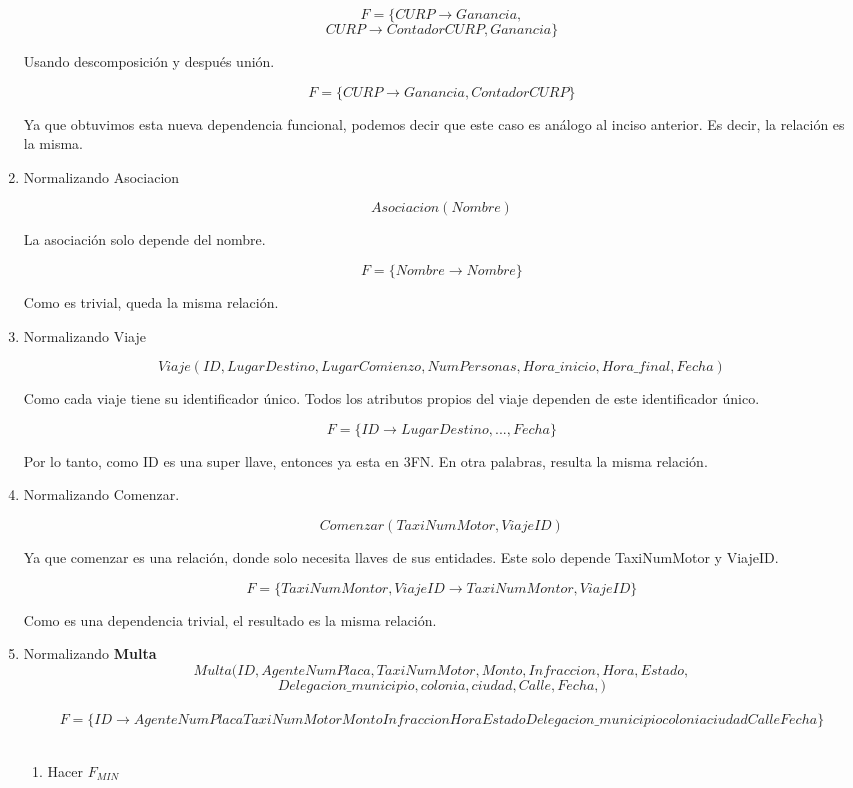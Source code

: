 \documentclass{article}
\begin{document}
\begin{enumerate}
			
			$$F = \{CURP \rightarrow Ganancia,$$
			$$CURP \rightarrow ContadorCURP, Ganancia\}$$
			
			Usando descomposición y después unión. 
			
			$$F = \{CURP \rightarrow Ganancia, ContadorCURP\}$$
			
			Ya que obtuvimos esta nueva dependencia funcional, podemos decir que este caso es análogo al inciso anterior. Es decir, la relación es la misma.
			
			\item Normalizando Asociacion
			
			$$Asociacion(Nombre)$$
			
			La asociación solo depende del nombre.
			
			$$F = \{Nombre \rightarrow Nombre\}$$
			
			Como es trivial, queda la misma relación.
			
			\item Normalizando Viaje
			
			$$Viaje(ID, LugarDestino, LugarComienzo, NumPersonas, Hora\_inicio, Hora\_final, Fecha)$$
			
			Como cada viaje tiene su identificador único.  Todos los atributos propios del viaje dependen de este identificador único.
			
			$$F = \{ID \rightarrow LugarDestino,...,Fecha \}$$
			
			Por lo tanto, como ID es una super llave, entonces ya esta en 3FN. En otra palabras, resulta la misma relación.
			
			\item Normalizando Comenzar.
			
			$$Comenzar(TaxiNumMotor, ViajeID)$$
			
			Ya que comenzar es una relación, donde solo necesita llaves de sus entidades. Este solo depende TaxiNumMotor y ViajeID.
			
			$$F = \{TaxiNumMontor, ViajeID \rightarrow TaxiNumMontor, ViajeID\}$$
			
			Como es una dependencia trivial, el resultado es la misma relación.
						
			\item  Normalizando \textbf{Multa}\\
			$$Multa(ID, AgenteNumPlaca, TaxiNumMotor, Monto, Infraccion, Hora, Estado, $$ 
			$$Delegacion\_ municipio, 
			colonia, ciudad, Calle, Fecha,)$$\\
			$$F = \lbrace ID \rightarrow AgenteNumPlaca TaxiNumMotor Monto Infraccion Hora
			Estado Delegacion\_municipio colonia ciudad Calle Fecha\rbrace$$\\
			\begin{enumerate}
				\item Hacer $F_{MIN}$\\
				

\end{enumerate}
\end{enumerate}
\end{document}
